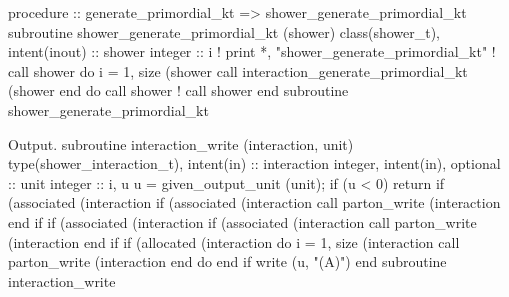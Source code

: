 \eatline
\nwendcode{}\nwdocspar
\nwenddocs{}\plusendmoddef
  procedure :: generate_primordial_kt => shower_generate_primordial_kt
\nwendcode{}\plusendmoddef
  subroutine shower_generate_primordial_kt (shower)
    class(shower_t), intent(inout) :: shower
    integer :: i
    ! print *, "shower_generate_primordial_kt"
    ! call shower%
    do i = 1, size (shower%
       call interaction_generate_primordial_kt (shower%
    end do
    call shower%
    ! call shower%
  end subroutine shower_generate_primordial_kt

\eatline
\nwendcode{}Output.
\nwenddocs{}\plusendmoddef
  subroutine interaction_write (interaction, unit)
    type(shower_interaction_t), intent(in) :: interaction
    integer, intent(in), optional :: unit
    integer :: i, u
    u = given_output_unit (unit); if (u < 0) return
    if (associated (interaction%
       if (associated (interaction%
            call parton_write (interaction%
    end if
    if (associated (interaction%
       if (associated (interaction%
            call parton_write (interaction%
    end if
    if (allocated (interaction%
       do i = 1, size (interaction%
          call parton_write (interaction%
       end do
    end if
    write (u, "(A)")
  end subroutine interaction_write

